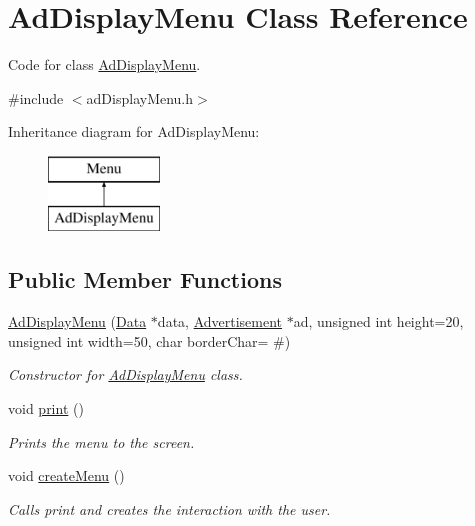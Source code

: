 \hypertarget{class_ad_display_menu}{}\section{Ad\+Display\+Menu Class Reference}
\label{class_ad_display_menu}


Code for class \hyperlink{class_ad_display_menu}{Ad\+Display\+Menu}.  




{\ttfamily \#include $<$ad\+Display\+Menu.\+h$>$}

Inheritance diagram for Ad\+Display\+Menu\+:\begin{figure}[H]
\begin{center}
\leavevmode
\includegraphics[height=2.000000cm]{class_ad_display_menu}
\end{center}
\end{figure}
\subsection*{Public Member Functions}
\begin{DoxyCompactItemize}
\item 
\hyperlink{class_ad_display_menu_a0b3787752d998c2c0fbb38b0086c4b15}{Ad\+Display\+Menu} (\hyperlink{class_data}{Data} $\ast$data, \hyperlink{class_advertisement}{Advertisement} $\ast$ad, unsigned int height=20, unsigned int width=50, char border\+Char= \textquotesingle{}\#\textquotesingle{})
\begin{DoxyCompactList}\small\item\em Constructor for \hyperlink{class_ad_display_menu}{Ad\+Display\+Menu} class. \end{DoxyCompactList}\item 
\hypertarget{class_ad_display_menu_acf175cade9d9e5a6d65f1eb901f17a84}{}void \hyperlink{class_ad_display_menu_acf175cade9d9e5a6d65f1eb901f17a84}{print} ()\label{class_ad_display_menu_acf175cade9d9e5a6d65f1eb901f17a84}

\begin{DoxyCompactList}\small\item\em Prints the menu to the screen. \end{DoxyCompactList}\item 
\hypertarget{class_ad_display_menu_ae10113101504905c1cf802085c603a8b}{}void \hyperlink{class_ad_display_menu_ae10113101504905c1cf802085c603a8b}{create\+Menu} ()\label{class_ad_display_menu_ae10113101504905c1cf802085c603a8b}

\begin{DoxyCompactList}\small\item\em Calls print and creates the interaction with the user. \end{DoxyCompactList}\end{DoxyCompactItemize}
